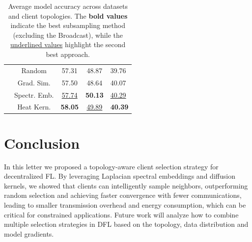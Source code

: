 \documentclass[journal]{IEEEtran}
\begin{document}
\begin{table}[]
\begin{tabular}{|c|c|clcll|}
                         & Random                      & \multicolumn{2}{c}{57.31}                   & \multicolumn{2}{c}{48.87}                   & 39.76            \\
                         & Grad. Sim.                  & \multicolumn{2}{c}{57.50}                    & \multicolumn{2}{c}{48.64}                   & 40.07           \\
                         & Spectr. Emb.                & \multicolumn{2}{c}{\underline{57.74}}         & \multicolumn{2}{c}{\textbf{50.13}}        & \underline{40.29}            \\
                         & Heat Kern.                  & \multicolumn{2}{c}{\textbf{58.05}}          & \multicolumn{2}{c}{\underline{49.89}}       & \textbf{40.39}           \\ \hline
\end{tabular}
\caption{Average model accuracy across datasets and client topologies. The \textbf{bold values} indicate the best subsampling method  (excluding the
Broadcast), while the \underline{underlined values} highlight the second best approach.} %
\label{tab:res_table}
\end{table}

\vspace{-0.4 cm}
\section{Conclusion} 
\label{sec:concl}
In this letter we proposed a topology-aware client selection strategy for decentralized FL. By leveraging Laplacian spectral embeddings and diffusion kernels, we showed that clients can intelligently sample neighbors,  outperforming random selection and achieving faster convergence with fewer communications, leading to smaller transmission overhead and energy consumption, which can be critical for constrained applications. Future work will analyze how to combine multiple selection strategies in DFL based on the topology, data distribution and model gradients.

 
\end{document}
